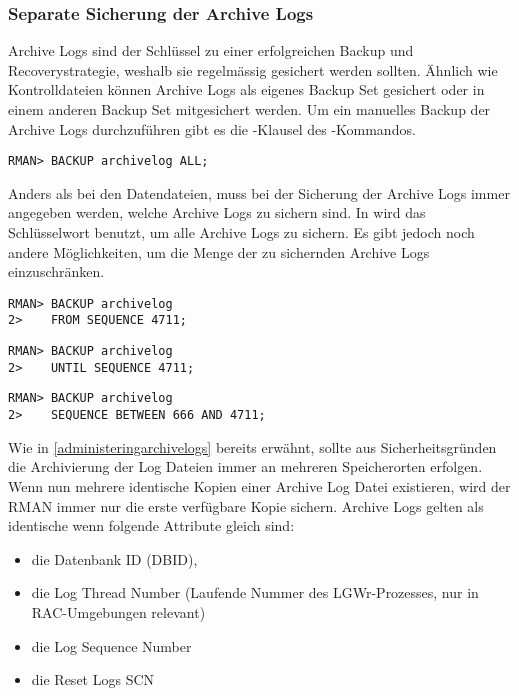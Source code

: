         \subsubsection{Separate Sicherung der Archive Logs}
          Archive Logs sind der Schlüssel zu einer erfolgreichen Backup und Recoverystrategie, weshalb sie regelmässig gesichert werden sollten. Ähnlich wie Kontrolldateien können Archive Logs als eigenes Backup Set gesichert oder in einem anderen Backup Set mitgesichert werden. Um ein manuelles Backup der Archive Logs durchzuführen gibt es die -Klausel des -Kommandos.
          \begin{lstlisting}[caption={Manuelles Backup aller Archive Logs},label=admin1316,language=rman]
RMAN> BACKUP archivelog ALL;
          \end{lstlisting}
          Anders als bei den Datendateien, muss bei der Sicherung der Archive Logs immer angegeben werden, welche Archive Logs zu sichern sind. In  wird das Schlüsselwort  benutzt, um alle Archive Logs zu sichern. Es gibt jedoch noch andere Möglichkeiten, um die Menge der zu sichernden Archive Logs einzuschränken.
          \begin{lstlisting}[caption={Alle Archive Logs ab Sequenz Nummer 4711 sichern},label=admin1317,language=rman]
RMAN> BACKUP archivelog
2>    FROM SEQUENCE 4711;
          \end{lstlisting}
          \begin{lstlisting}[caption={Alle Archive Logs bis Sequenz Nummer 4711 sichern},label=admin1318,language=rman]
RMAN> BACKUP archivelog
2>    UNTIL SEQUENCE 4711;
          \end{lstlisting}
          \begin{lstlisting}[caption={Alle Archive Logs zwischen Sequenz Nummer 666 und 4711 sichern},label=admin1319,language=rman]
RMAN> BACKUP archivelog
2>    SEQUENCE BETWEEN 666 AND 4711;
          \end{lstlisting}
          Wie in \ref{administeringarchivelogs} bereits erwähnt, sollte aus Sicherheitsgründen die Archivierung der Log Dateien immer an mehreren Speicherorten erfolgen. Wenn nun mehrere identische Kopien einer Archive Log Datei existieren, wird der RMAN immer nur die erste verfügbare Kopie sichern. Archive Logs gelten als identische wenn folgende Attribute gleich sind:
          \begin{itemize}
            \item die Datenbank ID (DBID),
            \item die Log Thread Number (Laufende Nummer des LGWr-Prozesses, nur in RAC-Umgebungen relevant)
            \item die Log Sequence Number
            \item die Reset Logs SCN
          \end{itemize}

